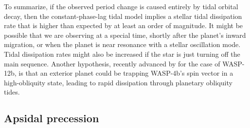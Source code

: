 \documentclass[12pt,twocolumn,tighten]{aastex62}
\begin{document}
To summarize, if the observed period change is caused entirely by
tidal orbital decay, then the constant-phase-lag tidal model implies a
stellar tidal dissipation rate that is higher than expected by at
least an order of magnitude.  It might be possible that we are
observing at a special time, shortly after the planet's inward
migration, or when the planet is near resonance with a stellar
oscillation mode.  Tidal dissipation rates might also be increased if
the star is just turning off the main sequence.  Another hypothesis,
recently advanced by \citet{millholland_obliquity_2018} for the case
of WASP-12b, is that an exterior planet could be trapping WASP-4b's
spin vector in a high-obliquity state, leading to rapid dissipation
through planetary obliquity tides.


\subsection{Apsidal precession}
\label{sec:apsidal_precession}

\end{document}
